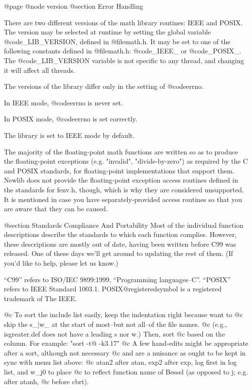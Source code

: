 @page
@node version
@section Error Handling

There are two different versions of the math library routines: IEEE
and POSIX.  The version may be selected at runtime by
setting the global variable @code{_LIB_VERSION}, defined in
@file{math.h}.  It may be set to one of the following constants defined
in @file{math.h}: @code{_IEEE_} or @code{_POSIX_}.
The @code{_LIB_VERSION} variable is not specific to any
thread, and changing it will affect all threads.

The versions of the library differ only in the setting of @code{errno}.

In IEEE mode, @code{errno} is never set.

In POSIX mode, @code{errno} is set correctly.

The library is set to IEEE mode by default.

The majority of the floating-point math functions are written
so as to produce the floating-point exceptions (e.g. "invalid",
"divide-by-zero") as required by the C and POSIX standards, for
floating-point implementations that support them.  Newlib does not provide
the floating-point exception access routines defined in the standards
for fenv.h, though, which is why they are considered unsupported.  It is
mentioned in case you have separately-provided access routines so that
you are aware that they can be caused.

@section Standards Compliance And Portability
Most of the individual function descriptions describe the standards to which
each function complies.  However, these descriptions are mostly out of date,
having been written before C99 was released.  One of these days we'll get
around to updating the rest of them.  (If you'd like to help, please let us
know.)

``C99'' refers to ISO/IEC 9899:1999, ``Programming languages--C''.
``POSIX'' refers to IEEE Standard 1003.1.  POSIX@registeredsymbol{} is a
registered trademark of The IEEE.

@c To sort the include list easily, keep the indentation right because want to
@c skip the s_|w_ at the start of most--but not all--of the file names.
@c (e.g., isgreater.def does not have a leading s nor w.)  Then, sort
@c based on the column.  For example:  "sort -t@ -k3.17"
@c A few hand-edits might be appropriate after a sort, although not necessary
@c and are a nuisance as ought to be kept in sync with menu list above:
@c atan2 after atan, exp2 after exp, log first in log list, and w_j0 to place
@c to reflect function name of Bessel (as opposed to j; e.g. after atanh,
@c before cbrt).

